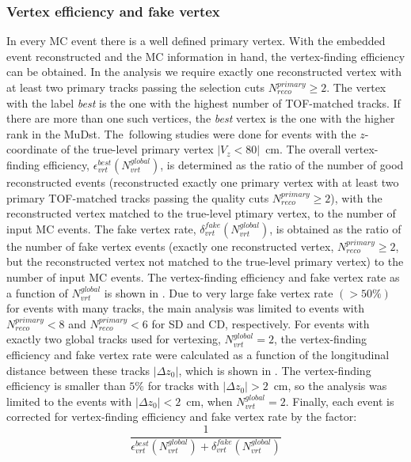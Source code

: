 \subsubsection{Vertex efficiency and fake vertex}
In every MC event there is a well defined primary vertex.  With the embedded
event reconstructed and the MC information in hand,
the vertex-finding efficiency can be obtained. In the analysis we require exactly one reconstructed vertex with at least two primary tracks passing the selection cuts $N_{reco}^{primary}\geq 2$. The vertex with the label \textit{best} is the one with the highest number of TOF-matched tracks. If there are more than one such vertices, the \textit{best} vertex is the one with the higher rank in the MuDst. The~following studies were done for events with the $z$-coordinate of the true-level primary vertex \mbox{$|V_z<80|$~cm}. The overall
vertex-finding efficiency, $\epsilon_{vrt}^ {best}\left(N_{vrt}^{global}\right)$, is determined as the
ratio of the number of good reconstructed events (reconstructed exactly one primary vertex with at least two primary TOF-matched tracks passing the quality cuts $N_{reco}^{primary}\geq 2$), with the reconstructed vertex matched to the true-level ptimary vertex, to the number of input MC events. The fake vertex
rate, $\delta_{vrt}^{fake}\left(N_{vrt}^{global}\right)$, is obtained as the ratio of the number 
of fake vertex events (exactly one reconstructed vertex, $N_{reco}^{primary}\geq 2$, but the reconstructed vertex not matched to the true-level primary vertex) to the number of input MC events. The vertex-finding efficiency and fake vertex rate as a function of $N^{global}_{vrt}$ is shown in  . Due to very large fake vertex rate $(>50\%)$ for events with many tracks, the main analysis was limited to events with $N_{reco}^{primary} < 8$ and $N_{reco}^{primary}<6$ for SD and CD, respectively. 
For events with exactly two global tracks used for vertexing, $N^{global}_{vrt}=2$, the vertex-finding efficiency and fake vertex rate were calculated as a function of the longitudinal distance between these tracks $|\Delta z_0|$, which is shown in . The vertex-finding efficiency is smaller than $5\%$ for tracks with $|\Delta z_0|>2$~cm, so the analysis was limited to the events with  $|\Delta z_0|<2$~cm, when $N^{global}_{vrt}=2$. Finally, each event is corrected for vertex-finding efficiency and fake vertex rate by the factor:
\begin{equation}
\frac{1}{\epsilon_{vrt}^ {best}\left(N_{vrt}^{global}\right) + \delta_{vrt}^{fake}\left(N_{vrt}^{global}\right)}
\label{eq:vertexEffi}
\end{equation}
